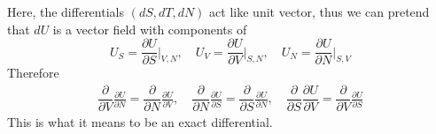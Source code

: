 \documentclass[../../../Main.tex]{subfiles}
\begin{document}
Here, the differentials $(dS,dT,dN)$ act like unit vector, thus we can pretend that $dU$ is a vector field with components of
\begin{equation*}
    U_S=\frac{\partial U}{\partial S}\bigg|_{V,N}, \quad
    U_V=\frac{ \partial U}{\partial V}\bigg|_{S,N},\quad
    U_N=\frac{\partial U}{\partial N}\bigg|_{S,V}
\end{equation*}
Therefore
\begin{align*}
    \dfrac{\partial }{\partial V} \frac{\partial U}{\partial N}  = \dfrac{\partial }{\partial N}\frac{ \partial U}{\partial V},\quad
    \dfrac{\partial }{\partial N}\frac{\partial U}{\partial S}=\dfrac{\partial }{\partial S}\frac{\partial U}{\partial N},\quad
    \dfrac{\partial }{\partial S}\dfrac{ \partial U}{\partial V}=\dfrac{\partial }{\partial V}\frac{\partial U}{\partial S}
\end{align*}
This is what it means to be an exact differential.
\end{document}
